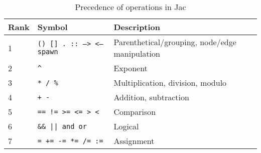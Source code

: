 \begin{table}[h]
    \small
    \centering
    \begin{tabular}{l l l}
        \toprule
        \textbf{Rank} & \textbf{Symbol}                   & \textbf{Description}                           \\
        \midrule
        1             & \texttt{() [] . :: --> <-- spawn} & Parenthetical/grouping, node/edge manipulation \\
        2             & \texttt{\textasciicircum}         & Exponent                                       \\
        3             & \texttt{* / \%  }                 & Multiplication, division, modulo               \\
        4             & \texttt{+ -    }                  & Addition, subtraction                          \\
        5             & \texttt{== != >= <= > <  }        & Comparison                                     \\
        6             & \texttt{\&\& || and or  }         & Logical                                        \\
        7             & \texttt{= += -= *= /= := }        & Assignment                                     \\
        \bottomrule
    \end{tabular}
    \caption{Precedence of operations in Jac}
    \label{tab:jacprecedence} %
\end{table}





